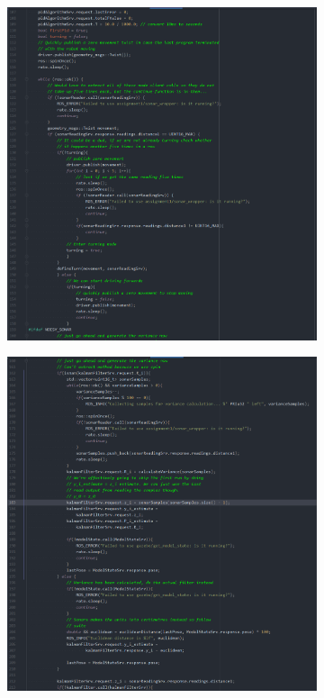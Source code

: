 \documentclass{article}
\begin{document}
\begin{figure}[ht]
\begin{subfigure}{.5\textwidth}
    \end{subfigure}
\end{figure}
\begin{figure}[ht]
    \begin{subfigure}{.5\textwidth}
        \centering
        \includegraphics[scale=0.24]{img/controller3.png}
    \end{subfigure}
    \begin{subfigure}{.5\textwidth}
        \centering
        \includegraphics[scale=0.24]{img/controller4.png}
    \end{subfigure}
\end{figure}
\end{document}
